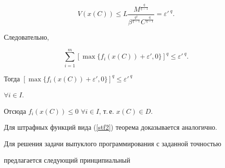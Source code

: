 \begin{pf}
\begin{equation*}


V(x(C))\leq L\frac{M^{\frac{q}{q-1}}}


{\beta^{\frac{q^2}{q-1}}C^{\frac{q}{q-1}}}


={\varepsilon'\,}^q.


\end{equation*}


Следовательно,


$$


\sum_{i=1}^{m}[\max\{f_{i}(x(C))+\varepsilon',0\}]^q\leq {\varepsilon'\,}^q.


$$


Тогда $[\max\{f_{i}(x(C))+\varepsilon',0\}]^q\leq {\varepsilon'\,}^q$ 


$\forall i\in I.$


Отсюда $f_{i}(x(C))\leq 0$ $\forall i\in I$, т.\,е. $x(C)\in D.$





Для штрафных функций вида (\ref{stf2}) теорема доказывается аналогично.


\end{pf}





Для решения задачи выпуклого программирования с заданной точностью


предлагается следующий принципиальный





